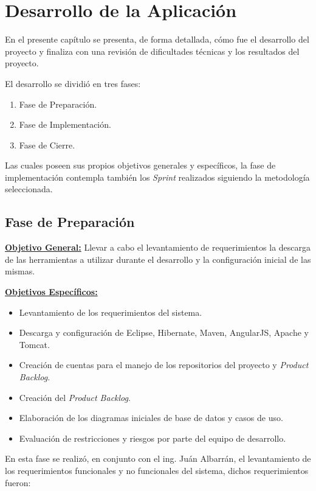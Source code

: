 \chapter{Desarrollo de la Aplicación}

En el presente capítulo se presenta, de forma detallada, cómo fue el desarrollo del proyecto y finaliza con una revisión de dificultades técnicas y los resultados del proyecto.

El desarrollo se dividió en tres fases:

\begin{enumerate}
    \item Fase de Preparación.    
    \item Fase de Implementación.
    \item Fase de Cierre.
\end{enumerate}

Las cuales poseen sus propios objetivos generales y específicos, la fase de implementación contempla también los \textit{Sprint} realizados siguiendo la metodología seleccionada.

\section{Fase de Preparación}
    
    \textbf{\underline{Objetivo General:}}
    Llevar a cabo el levantamiento de requerimientos la descarga de las herramientas a utilizar durante el desarrollo y la configuración inicial de las mismas.
    
    \textbf{\underline{Objetivos Específicos:}}
    \begin{itemize}
        \item Levantamiento de los requerimientos del sistema.
        \item Descarga y configuración de Eclipse, Hibernate, Maven, AngularJS, Apache y Tomcat.
        \item Creación de cuentas para el manejo de los repositorios del proyecto y \textit{Product Backlog}.
        \item Creación del \textit{Product Backlog}.
        \item Elaboración de los diagramas iniciales de base de datos y casos de uso.
        \item Evaluación de restricciones y riesgos por parte del equipo de desarrollo.
    \end{itemize}
    
    En esta fase se realizó, en conjunto con el ing. Juán Albarrán, el levantamiento de los requerimientos funcionales y no funcionales del sistema, dichos requerimientos fueron:
    
